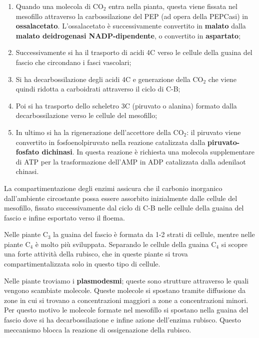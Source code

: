 \documentclass[]{article}
\begin{document}
\begin{enumerate}
\def\labelenumi{\arabic{enumi}.}
\item
  Quando una molecola di CO$_2$ entra nella pianta, questa viene fissata
  nel mesofillo attraverso la carbossilazione del PEP (ad opera della
  PEPCasi) in \textbf{ossalacetato}. L'ossalacetato è successivamente
  convertito in \textbf{malato} dalla \textbf{malato deidrogenasi
  NADP-dipendente}, o convertito in \textbf{aspartato};
\item
  Successivamente si ha il trasporto di acidi 4C verso le cellule della
  guaina del fascio che circondano i fasci vascolari;
\item
  Si ha decarbossilazione degli acidi 4C e generazione della CO$_2$ che
  viene quindi ridotta a carboidrati attraverso il ciclo di C-B;
\item
  Poi si ha trasporto dello scheletro 3C (piruvato o alanina) formato
  dalla decarbossilazione verso le cellule del mesofillo;
\item
  In ultimo si ha la rigenerazione dell'accettore della CO$_2$: il
  piruvato viene convertito in fosfoenolpiruvato nella reazione
  catalizzata dalla \textbf{piruvato-fosfato dichinasi}. In questa
  reazione è richiesta una molecola supplementare di ATP per la
  trasformazione dell'AMP in ADP catalizzata dalla adenilaot chinasi.
\end{enumerate}

La compartimentazione degli enzimi assicura che il carbonio inorganico
dall'ambiente circostante possa essere assorbito inizialmente dalle
cellule del mesofillo, fissato successivamente dal ciclo di C-B nelle
cellule della guaina del fascio e infine esportato verso il floema.

Nelle piante C$_3$ la guaina del fascio è formata da 1-2 strati di
cellule, mentre nelle piante C$_4$ è molto più sviluppata. Separando le
cellule della guaina C$_4$ si scopre una forte attività della rubisco,
che in queste piante si trova compartimentalizzata solo in questo tipo
di cellule.

Nelle piante troviamo i \textbf{plasmodesmi}; queste sono strutture
attraverso le quali vengono scambiate molecole. Queste molecole si
spostano tramite diffusione da zone in cui si trovano a concentrazioni
maggiori a zone a concentrazioni minori. Per questo motivo le molecole
formate nel mesofillo si spostano nella guaina del fascio dove si ha
decarbossilazione e infine azione dell'enzima rubisco. Questo meccanismo
blocca la reazione di ossigenazione della rubisco.
\end{document}
